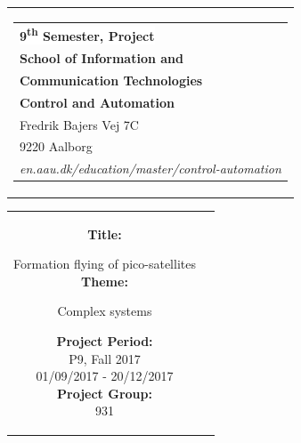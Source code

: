 % 
\begin{nopagebreak}
{\samepage 

\begin{tabular}{r}
\parbox{\textwidth}{  
\hfill \hspace{2cm} \parbox{8cm}{\begin{tabular}{l} %
{\small \textbf{\textcolor{aaublue}{\colorbox{white}{9\textsuperscript{th} Semester, Project}}}}\\
{\small \textbf{\textcolor{aaublue}{School of Information and}}}\\
{\small \textbf{\textcolor{aaublue}{Communication Technologies}}}\\ 
{\small \textbf{\textcolor{aaublue}{Control and Automation}}}\\
{\small \textcolor{aaublue}{Fredrik Bajers Vej 7C}} \\
{\small \textcolor{aaublue}{9220 Aalborg}} \\
{\small \textcolor{aaublue}{\emph{en.aau.dk/education/master/control-automation}}}
\end{tabular}}}
\end{tabular}

\begin{tabular}{cc}
\parbox{7cm}{

\textbf{Title:}

Formation flying of pico-satellites\\ %

\textbf{Theme:}

\small{
 Complex systems\\
}


\parbox{8cm}{


\textbf{Project Period:}\\
P9, Fall 2017\\
01/09/2017 - 20/12/2017\\
   
\textbf{Project Group:}\\
931\\ %
  
}}
\end{tabular}}
\end{nopagebreak}
